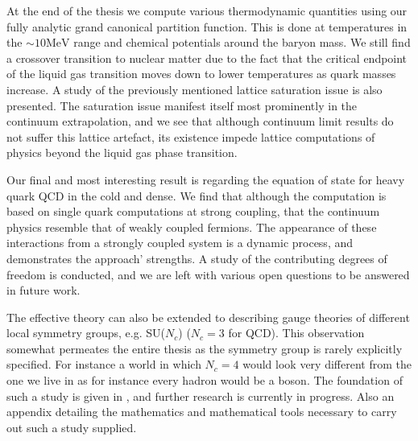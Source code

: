 {At the end of the thesis we compute various thermodynamic quantities using our
fully analytic grand canonical partition function. This is done at temperatures
in the $\sim 10 \mathrm{MeV}$ range and chemical potentials around the baryon
mass. We still find a crossover transition to nuclear matter due to the fact
that the critical endpoint of the liquid gas transition moves down to lower
temperatures as quark masses increase. A study of the previously mentioned
lattice saturation issue is also presented. The saturation issue manifest itself
most prominently in the continuum extrapolation, and we see that although
continuum limit results do not suffer this lattice artefact, its existence
impede lattice computations of physics beyond the liquid gas phase transition.

Our final and most interesting result is regarding the equation of state for
heavy quark QCD in the cold and dense. We find that although the computation is
based on single quark computations at strong coupling, that the continuum
physics resemble that of weakly coupled fermions. The appearance of these
interactions from a strongly coupled system is a dynamic process, and
demonstrates the approach' strengths.  A study of the contributing degrees of
freedom is conducted, and we are left with various open questions to be answered
in future work. 

The effective theory can also be extended to describing gauge theories of
different local symmetry groups, e.g. SU($N_c$) ($N_c = 3$ for QCD). This
observation somewhat permeates the entire thesis as the symmetry group is rarely
explicitly specified. For instance a world in which $N_c = 4$ would look very
different from the one we live in as for instance every hadron would be a boson.
The foundation of such a study is given in , and further research
is currently in progress. Also an appendix detailing the mathematics and
mathematical tools necessary to carry out such a study supplied.


\par}
